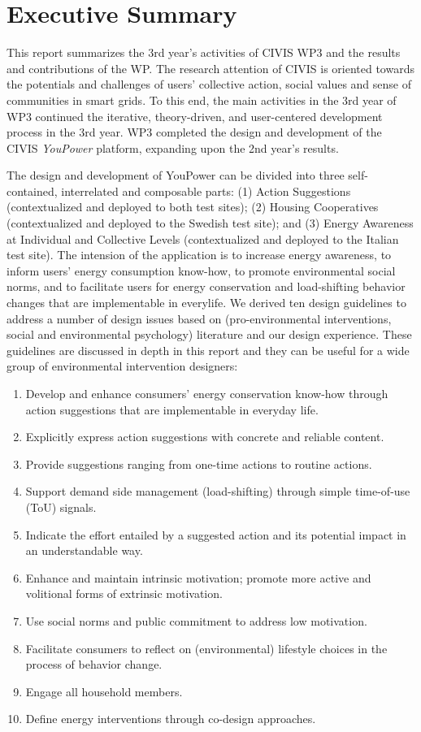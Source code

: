 \section*{Executive Summary}

This report summarizes the 3rd year's activities of CIVIS WP3 and the results and contributions of the WP. The research attention of CIVIS is oriented towards the potentials and challenges of users' collective action, social values and sense of communities in smart grids. To this end, the main activities in the 3rd year of WP3 continued the iterative, theory-driven, and user-centered development process in the 3rd year. WP3 completed the design and development of the CIVIS \textit{YouPower} platform, expanding upon the 2nd year's results.

The design and development of YouPower can be divided into three self-contained, interrelated and composable parts: (1) Action Suggestions (contextualized and deployed to both test sites); (2) Housing Cooperatives (contextualized and deployed to the Swedish test site); and (3) Energy Awareness at Individual and Collective Levels (contextualized and deployed to the Italian test site). The intension of the application is to increase energy awareness, to inform users' energy consumption know-how, to promote environmental social norms, and to facilitate users for energy conservation and load-shifting behavior changes that are implementable in everylife. We derived ten design guidelines to address a number of design issues based on (pro-environmental interventions, social and environmental psychology) literature and our design experience. These guidelines are discussed in depth in this report and they can be useful for a wide group of environmental intervention designers: 
\begin{enumerate}
\item Develop and enhance consumers' energy conservation know-how through action suggestions
that are implementable in everyday life.
\item Explicitly express action suggestions with concrete and reliable content.
\item Provide suggestions ranging from one-time actions to routine actions.
\item Support demand side management (load-shifting) through simple time-of-use (ToU) signals.
\item Indicate the effort entailed by a suggested action and its potential impact in an understandable way.
\item Enhance and maintain intrinsic motivation; promote more active and volitional forms
of extrinsic motivation.
\item Use social norms and public commitment to address low motivation.
\item Facilitate consumers to reflect on (environmental) lifestyle choices in the process
of behavior change.
\item Engage all household members.
\item Define energy interventions through co-design approaches.
\end{enumerate}

